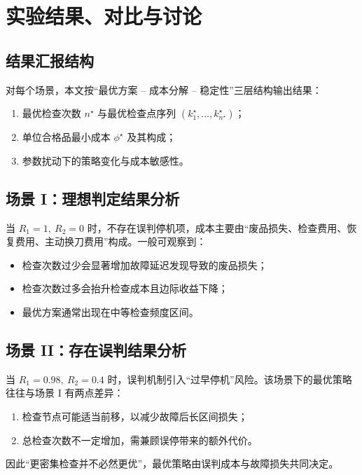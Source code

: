 \chapter{实验结果、对比与讨论}

\section{结果汇报结构}
对每个场景，本文按“最优方案 -- 成本分解 -- 稳定性”三层结构输出结果：
\begin{enumerate}
  \item 最优检查次数 $n^\star$ 与最优检查点序列 $(k_1^\star,\ldots,k_{n^\star}^\star)$；
  \item 单位合格品最小成本 $\phi^\star$ 及其构成；
  \item 参数扰动下的策略变化与成本敏感性。
\end{enumerate}

\section{场景 I：理想判定结果分析}
当 $R_1=1,\ R_2=0$ 时，不存在误判停机项，成本主要由“废品损失、检查费用、恢复费用、主动换刀费用”构成。一般可观察到：
\begin{itemize}
  \item 检查次数过少会显著增加故障延迟发现导致的废品损失；
  \item 检查次数过多会抬升检查成本且边际收益下降；
  \item 最优方案通常出现在中等检查频度区间。
\end{itemize}

\section{场景 II：存在误判结果分析}
当 $R_1=0.98,\ R_2=0.4$ 时，误判机制引入“过早停机”风险。该场景下的最优策略往往与场景 I 有两点差异：
\begin{enumerate}
  \item 检查节点可能适当前移，以减少故障后长区间损失；
  \item 总检查次数不一定增加，需兼顾误停带来的额外代价。
\end{enumerate}
因此“更密集检查并不必然更优”，最优策略由误判成本与故障损失共同决定。

